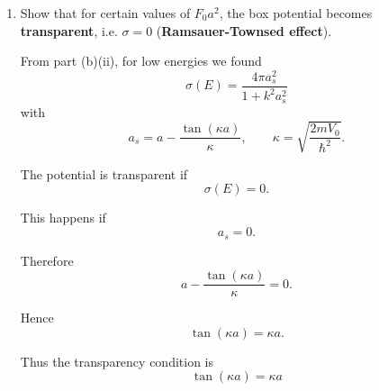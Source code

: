\documentclass[11pt,a4paper]{scrartcl}
\begin{document}
\begin{enumerate}
\begin{enumerate}
\begin{calculationbox}
                        In general,
                        \[
                        \delta_l \sim k^{2l+1}.
                        \]

                        Therefore,
                        for $l>0$,
                        \[
                        \delta_l \to 0
                        \quad
                        \text{faster than}
                        \quad
                        \delta_0.
                        \]

                        Hence only the $l=0$ contribution remains relevant:
                        \[
                        \boxed{
                        \text{low-energy scattering reduces to s-wave scattering.}
                        }
                        \]
                    \end{calculationbox}

                \item
                    Show that for certain values of $F_0 a^2$, the box potential becomes \textbf{transparent}, i.e. $\sigma = 0$ (\textbf{Ramsauer-Townsed effect}).
                    \begin{calculationbox}
                        From part (b)(ii), for low energies we found
                        \[
                        \sigma(E)
                        =
                        \frac{4\pi a_s^2}{1+k^2a_s^2}
                        \]
                        with
                        \[
                        a_s
                        =
                        a-\frac{\tan(\kappa a)}{\kappa},
                        \qquad
                        \kappa=\sqrt{\frac{2mV_0}{\hbar^2}}.
                        \]

                        The potential is transparent if
                        \[
                        \sigma(E)=0.
                        \]

                        This happens if
                        \[
                        a_s=0.
                        \]

                        Therefore
                        \[
                        a-\frac{\tan(\kappa a)}{\kappa}=0.
                        \]

                        Hence
                        \[
                        \tan(\kappa a)=\kappa a.
                        \]

                        Thus the transparency condition is
                        \[
                        \boxed{
                        \tan(\kappa a)=\kappa a
                        }
                        \]


\end{calculationbox}
\end{enumerate}
\end{enumerate}
\end{document}
